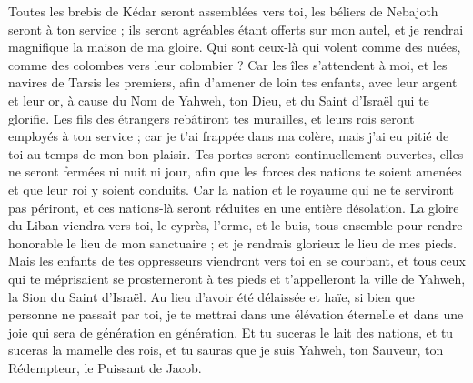 \begin{multicols}{2}
Toutes les brebis de Kédar seront assemblées vers toi, les béliers de Nebajoth seront à ton service ; ils seront agréables étant offerts sur mon autel, et je rendrai magnifique la maison de ma gloire.
Qui sont ceux-là qui volent comme des nuées, comme des colombes vers leur colombier ?
Car les îles s'attendent à moi, et les navires de Tarsis les premiers, afin d'amener de loin tes enfants, avec leur argent et leur or, à cause du Nom de Yahweh, ton Dieu, et du Saint d'Israël qui te glorifie.
Les fils des étrangers rebâtiront tes murailles, et leurs rois seront employés à ton service ; car je t'ai frappée dans ma colère, mais j'ai eu pitié de toi au temps de mon bon plaisir.
Tes portes seront continuellement ouvertes, elles ne seront fermées ni nuit ni jour, afin que les forces des nations te soient amenées et que leur roi y soient conduits.
Car la nation et le royaume qui ne te serviront pas périront, et ces nations-là seront réduites en une entière désolation.
La gloire du Liban viendra vers toi, le cyprès, l'orme, et le buis, tous ensemble pour rendre honorable le lieu de mon sanctuaire ; et je rendrais glorieux le lieu de mes pieds.
Mais les enfants de tes oppresseurs viendront vers toi en se courbant, et tous ceux qui te méprisaient se prosterneront à tes pieds et t'appelleront la ville de Yahweh, la Sion du Saint d'Israël.
Au lieu d'avoir été délaissée et haïe, si bien que personne ne passait par toi, je te mettrai dans une élévation éternelle et dans une joie qui sera de génération en génération.
Et tu suceras le lait des nations, et tu suceras la mamelle des rois, et tu sauras que je suis Yahweh, ton Sauveur, ton Rédempteur, le Puissant de Jacob.

\end{multicols}
